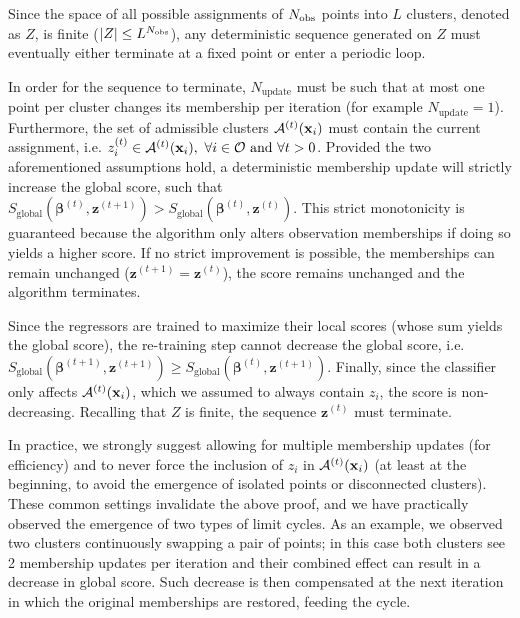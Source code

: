 \smallskip
Since the space of all possible assignments of $N_{\mathrm{obs}}$ points into $L$ clusters, denoted as $Z$, is finite ($|Z| \leq L^{N_{\mathrm{obs}}}$), any deterministic sequence generated on $Z$ must eventually either terminate at a fixed point or enter a periodic loop.

\smallskip
In order for the sequence to terminate, $N_{\mathrm{update}}$ must be such that at most one point per cluster changes its membership per iteration (for example $N_{\mathrm{update}} = 1$). Furthermore, the set of admissible clusters $\mathcal{A}^{(t)}(\mathbf{x}_i)$ must contain the current assignment, i.e. $z_i^{(t)} \in \mathcal{A}^{(t)}(\mathbf{x}_i),\text{ } \forall i \in \mathcal{O} \text{ and } \forall t>0$. Provided the two aforementioned assumptions hold, a deterministic membership update will strictly increase the global score, such that $S_{\mathrm{global}}(\boldsymbol{\beta}^{(t)}, \mathbf{z}^{(t+1)}) > S_{\mathrm{global}}(\boldsymbol{\beta}^{(t)}, \mathbf{z}^{(t)})$. This strict monotonicity is guaranteed because the algorithm only alters observation memberships if doing so yields a higher score. If no strict improvement is possible, the memberships can remain unchanged ($\mathbf{z}^{(t+1)} = \mathbf{z}^{(t)}$), the score remains unchanged and the algorithm terminates.

\smallskip
Since the regressors are trained to maximize their local scores (whose sum yields the global score), the re-training step cannot decrease the global score, i.e. $S_{\mathrm{global}}(\boldsymbol{\beta}^{(t+1)}, \mathbf{z}^{(t+1)}) \geq S_{\mathrm{global}}(\boldsymbol{\beta}^{(t)}, \mathbf{z}^{(t+1)})$. Finally, since the classifier only affects $\mathcal{A}^{(t)}(\mathbf{x}_i)$, which we assumed to always contain $z_i$, the score is non-decreasing. Recalling that $Z$ is finite, the sequence $\mathbf{z}^{(t)}$ must terminate. 

\smallskip
In practice, we strongly suggest allowing for multiple membership updates (for efficiency) and to never force the inclusion of $z_i$ in $\mathcal{A}^{(t)}(\mathbf{x}_i)$ (at least at the beginning, to avoid the emergence of isolated points or disconnected clusters). These common settings invalidate the above proof, and we have practically observed the emergence of two types of limit cycles. As an example, we observed two clusters continuously swapping a pair of points; in this case both clusters see 2 membership updates per iteration and their combined effect can result in a decrease in global score. Such decrease is then compensated at the next iteration in which the original memberships are restored, feeding the cycle.

